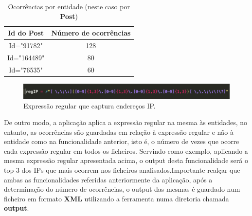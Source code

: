 \documentclass[11pt,a4paper]{report}%
\begin{document}
\begin{table}[h!] %
\begin{center} %
\begin{tabular}{ | c | c | } %
  \hline  %
  Id do Post &  Número de ocorrências \\
  \hline
  Id="91782"  & 128 \\
  Id="164489" & 80 \\
  Id="76535" & 60 \\
  \hline
\end{tabular}
\end{center}
\caption{Ocorrências por entidade (neste caso por \textbf{Post})} \label{tab:tabelaBasica}
\end{table}

\begin{figure}[]
	\centering
	\includegraphics[scale=0.5]{regexIp.png}
	\caption{Expressão regular que captura endereços IP.}
	\label{img:pag}
\end{figure}

\newpage

De outro modo, a aplicação aplica a expressão regular na mesma às entidades, no entanto, as ocorrências são guardadas em relação à expressão regular e não à entidade como na funcionalidade anterior, isto é, o número de vezes que ocorre cada expressão regular em todos os ficheiros. Servindo como exemplo, aplicando a mesma expressão regular apresentada acima, o output desta funcionalidade será o top 3 dos IPs que mais ocorrem nos ficheiros analisados.\newline \newline Importante realçar que ambas as funcionalidades referidas anteriormente da aplicação, após a determinação do número de ocorrências, o output das mesmas é guardado num ficheiro em formato \textbf{XML} utilizando a ferramenta  numa diretoria chamada \textbf{output}. 
\end{document}
